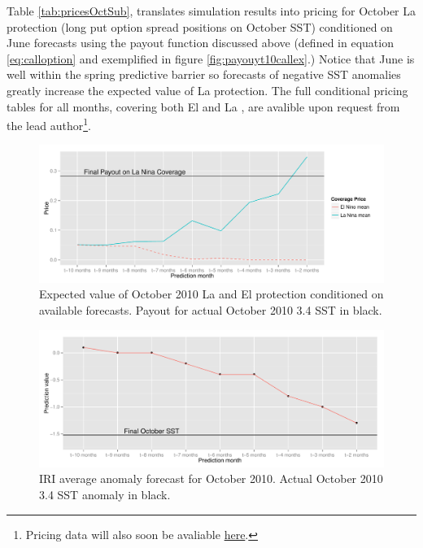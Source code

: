\documentclass[article]{jss}
\begin{document}
Table \ref{tab:pricesOctSub}, translates simulation results into pricing
for October La  protection (long put option spread
positions on October SST) conditioned on June forecasts using the payout
function discussed above (defined in equation \ref{eq:calloption} and
exemplified in figure \ref{fig:payouyt10callex}.) Notice that June is
well within the spring predictive barrier so forecasts of negative SST
anomalies greatly increase the expected value of La 
protection. The full conditional pricing tables for all months, covering
both El  and La , are avalible upon request
from the lead author\footnote{Pricing data will also soon be avaliable
  \href{www.directclimatemarkets.com}{here}.}.

\begin{figure}[!htbp]
\begin{center}
  \includegraphics[width=\linewidth]{img/pricesOctober2010.pdf}
  \caption{Expected value of October 2010 La  and El  protection conditioned on available forecasts. Payout for actual October 2010  3.4 SST in black.}
   \label{fig:pricesOctober2010}
      \end{center}
\end{figure}

\begin{figure}[!htbp]
\begin{center}
  \includegraphics[width=\linewidth]{img/predOctober2010.pdf}
  \caption{IRI average anomaly forecast for October 2010. Actual October 2010  3.4 SST anomaly in black.}
   \label{fig:predOctober2010}
   \end{center}
\end{figure}
\end{document}
